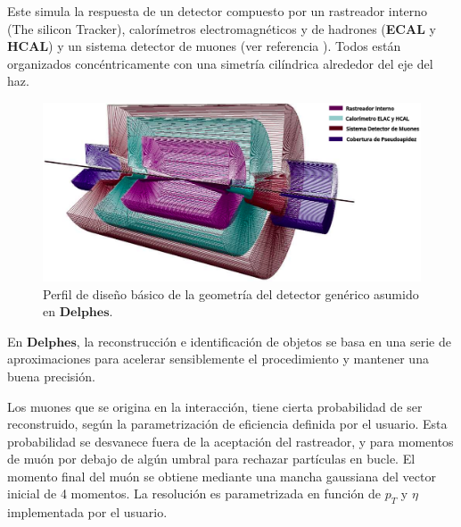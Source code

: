 Este simula la respuesta de un detector compuesto por un rastreador interno (The silicon Tracker), calorímetros electromagnéticos y de hadrones (\textbf{ECAL} y \textbf{HCAL}) y un sistema detector de muones (ver referencia \cite{de_favereau_Delphes_2014}). Todos están organizados concéntricamente con una simetría cilíndrica alrededor del eje del haz. %

\begin{figure}[!t]
    \centering
    \includegraphics[width=.95\textwidth]{Cap2/imagenes/delphes.png}
    \caption[Perfil de diseño básico de la geometría del detector genérico asumido en  \textbf{Delphes}.]{Perfil de diseño básico de la geometría del detector genérico asumido en  $\mathbf{Delphes}$.\footnotemark}
    \label{Delphes}
\end{figure}


En $\mathbf{Delphes}$, la reconstrucción e identificación de objetos se basa en una serie de aproximaciones para acelerar sensiblemente el procedimiento y mantener una buena precisión. 

Los muones que se origina en la interacción, tiene cierta probabilidad de ser reconstruido, según la parametrización de eficiencia definida por el usuario. Esta probabilidad se desvanece fuera de la aceptación del rastreador, y para momentos de muón por debajo de algún umbral para rechazar partículas en bucle. El momento final del muón se obtiene mediante una mancha gaussiana del vector inicial de 4 momentos. La resolución es parametrizada en función de $p_T$ y $\eta$ implementada por el usuario.

